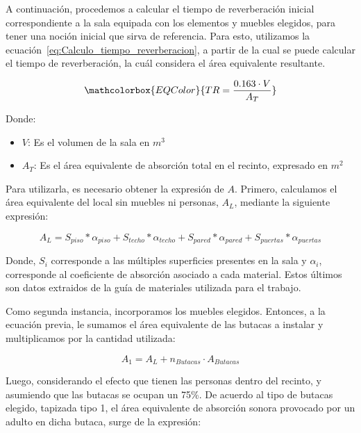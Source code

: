 \par A continuación, procedemos a calcular el tiempo de reverberación inicial correspondiente a la sala equipada con los elementos y muebles elegidos, para tener una noción inicial que sirva de referencia. Para esto, utilizamos la ecuación~\eqref{eq:Calculo_tiempo_reverberacion}, a partir de la cual se puede  calcular el tiempo de reverberación, la cuál considera el área equivalente resultante.

\begin{equation}
   \mathcolorbox{EQColor}{  TR = \frac{0.163 \cdot V}{A_T} }
    \label{eq:Calculo_tiempo_reverberacion}
\end{equation}

Donde:
\begin{itemize}
    \item $V$: Es el volumen de la sala en $m^3$
    \item $A_T$: Es el área equivalente de absorción total en el recinto, expresado en $m^2$
\end{itemize}

\par Para utilizarla, es necesario obtener la expresión de $A$. Primero, calculamos el área equivalente del local sin muebles ni personas, $A_L$, mediante la siguiente expresión:

\begin{equation}
    A_L = S_{piso} * \alpha_{piso} +S_{techo} * \alpha_{techo} + S_{pared} * \alpha_{pared} + S_{puertas} * \alpha_{puertas}
\end{equation}

\par Donde, $S_i$ corresponde a las múltiples superficies presentes en la sala y $\alpha_i$, corresponde al coeficiente de absorción asociado a cada material. Estos últimos son datos extraidos de la guía de materiales utilizada para el trabajo.

\par Como segunda instancia, incorporamos los muebles elegidos. Entonces, a la ecuación previa, le sumamos el área equivalente de las butacas a instalar y multiplicamos por la cantidad  utilizada:

\begin{equation}
    A_1 = A_L + n_{Butacas}\cdot A_{Butacas}
\end{equation}

\par Luego, considerando el efecto que tienen las personas dentro del recinto, y asumiendo que las butacas se ocupan un 75\%. De acuerdo al tipo de butacas elegido, tapizada tipo 1, el área equivalente de absorción sonora provocado por un adulto en dicha butaca, surge de la expresión:


